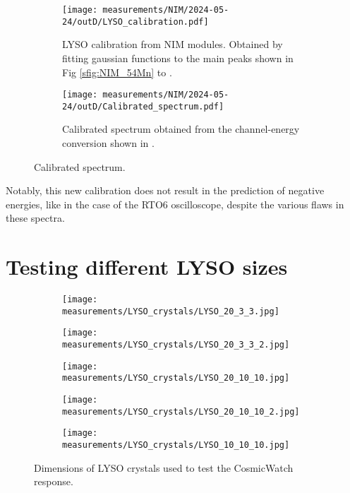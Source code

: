 \begin{figure}[H]
  \begin{subfigure}[t]{\textwidth}
    \centering
    \texttt{[image: measurements/NIM/2024-05-24/outD/LYSO\_calibration.pdf]}
    \caption{\label{sfig:NIM_LYSO_calibration}LYSO calibration from NIM modules. Obtained by fitting gaussian functions to the main peaks shown in Fig \ref{sfig:NIM_54Mn} to .}
  \end{subfigure}
  \medskip
  \begin{subfigure}[t]{\textwidth}
    \centering
    \texttt{[image: measurements/NIM/2024-05-24/outD/Calibrated\_spectrum.pdf]}
    \caption{\label{sfig:NIM_LYSO_calibrated_spectrum}Calibrated spectrum obtained from the channel-energy conversion shown in .}
  \end{subfigure}
  \caption{\label{fig:NIM_calibration}Calibrated spectrum.}
\end{figure}

Notably, this new calibration does not result in the prediction of negative energies, like in the case of the RTO6 oscilloscope, despite the various flaws in these spectra. 

\section{Testing different LYSO sizes}\label{sec:LYSO_size}

\begin{figure}
  \begin{subfigure}[t]{0.49\textwidth}
    \centering
    \texttt{[image: measurements/LYSO\_crystals/LYSO\_20\_3\_3.jpg]}
  \end{subfigure}
  \begin{subfigure}[t]{0.49\textwidth}
    \centering
    \texttt{[image: measurements/LYSO\_crystals/LYSO\_20\_3\_3\_2.jpg]}
  \end{subfigure}
  \medskip
  \begin{subfigure}[t]{0.49\textwidth}
    \centering
    \texttt{[image: measurements/LYSO\_crystals/LYSO\_20\_10\_10.jpg]}
  \end{subfigure}
  \begin{subfigure}[t]{0.49\textwidth}
    \centering
    \texttt{[image: measurements/LYSO\_crystals/LYSO\_20\_10\_10\_2.jpg]}
  \end{subfigure}
  \medskip
  \begin{subfigure}[t]{\textwidth}
    \centering
    \texttt{[image: measurements/LYSO\_crystals/LYSO\_10\_10\_10.jpg]}
  \end{subfigure}
  \caption{\label{fig:LYSO_crystals}Dimensions of LYSO crystals used to test the CosmicWatch response.}
\end{figure}